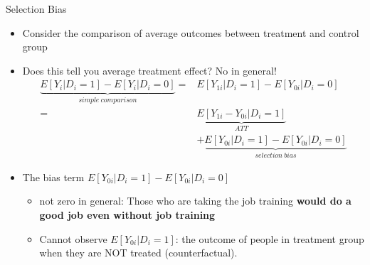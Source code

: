 \documentclass[
  ignorenonframetext,
]{beamer}
\begin{document}
\begin{frame}{Selection Bias}
\protect\hypertarget{selection-bias}{}
\begin{itemize}
\item
  Consider the comparison of average outcomes between treatment and
  control group
\item
  Does this tell you average treatment effect? No in general!
  \[\begin{aligned}
  \underbrace{E[Y_{i}|D_{i}=1]-E[Y_{i}|D_{i}=0]}_{simple\ comparison}= & E[Y_{1i}|D_{i}=1]-E[Y_{0i}|D_{i}=0]\\
  = & \underbrace{E[Y_{1i}-Y_{0i}|D_{i}=1]}_{ATT}\\
   & +\underbrace{E[Y_{0i}|D_{i}=1]-E[Y_{0i}|D_{i}=0]}_{selection\ bias}\end{aligned}\]
\item
  The bias term \(E[Y_{0i}|D_{i}=1]-E[Y_{0i}|D_{i}=0]\)

  \begin{itemize}
  \item
    not zero in general: Those who are taking the job training
    \textbf{would do a good job even without job training}
  \item
    Cannot observe \(E[Y_{0i}|D_{i}=1]\): the outcome of people in
    treatment group when they are NOT treated (counterfactual).
  \end{itemize}
\end{itemize}
\end{frame}
\end{document}
